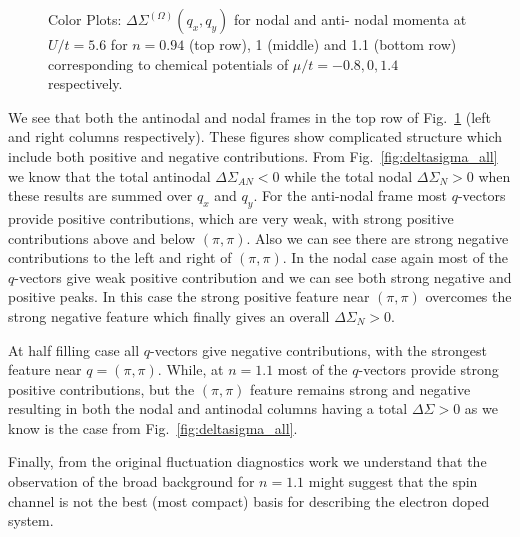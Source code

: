 \begin{figure}[ht]
\caption{ Color Plots: $\Delta \Sigma^{(\Omega)}(q_x,q_y)$ for nodal and anti- nodal momenta at $U/t= 5.6$ for $n=0.94$ (top row), 1 (middle) and 1.1 (bottom row) corresponding to chemical potentials of $\mu/t = -0.8, 0, 1.4 $ respectively.  
\label{fig:delta_sigma}}
\end{figure}


 We see that both the antinodal and nodal frames in the top row of Fig.~\ref{fig:delta_sigma} (left and right columns respectively). These figures show complicated structure which include both positive and negative contributions.
From Fig.~\ref{fig:deltasigma_all} we know that the total antinodal $\Delta \Sigma_{AN}<0$ while the total nodal $\Delta \Sigma_{N} >0$ when these results are summed over $q_x$ and $q_y$. 
For the anti-nodal frame most $q$-vectors provide positive contributions, which are very weak, with strong positive contributions above and below $(\pi,\pi)$. Also we can see there are strong negative contributions to the left and right of $(\pi,\pi)$.
In the nodal case again most of the $q$-vectors give weak positive contribution and we can see both strong negative and positive peaks. In this case the strong positive feature near $(\pi,\pi)$ overcomes the strong negative feature which finally gives an overall $\Delta \Sigma_N >0$.

 At half filling case all $q$-vectors give negative contributions, with the strongest feature near $q=(\pi,\pi)$. 
While, at $n=1.1$ most of the $q$-vectors provide strong positive contributions, but the $(\pi,\pi)$ feature remains strong and negative resulting in both the nodal and antinodal columns having a total $\Delta\Sigma>0$ as we know is the case from Fig.~\ref{fig:deltasigma_all}.

Finally, from the original fluctuation diagnostics work\cite{Toschi} we understand that the observation of the broad background for $n=1.1$ might suggest that the spin channel is not the best (most compact) basis for describing the electron doped system.


